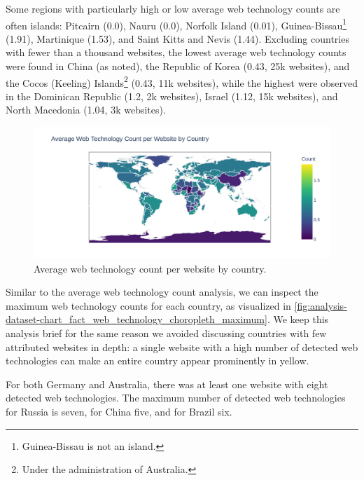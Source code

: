 Some regions with particularly high or low average web technology counts are often islands: Pitcairn (0.0), Nauru (0.0), Norfolk Island (0.01), Guinea-Bissau\footnote{Guinea-Bissau is not an island.} (1.91), Martinique (1.53), and Saint Kitts and Nevis (1.44).
Excluding countries with fewer than a thousand websites, the lowest average web technology counts were found in China (as noted), the Republic of Korea (0.43, 25k websites), and the Cocos (Keeling) Islands\footnote{Under the administration of Australia.} (0.43, 11k websites), while the highest were observed in the Dominican Republic (1.2, 2k websites), Israel (1.12, 15k websites), and North Macedonia (1.04, 3k websites).

\begin{figure}[H]
    \centering
    \includegraphics[width=\textwidth]{figures/charts/large/chart_fact_web_technology_choropleth_average.png}
    \caption{Average web technology count per website by country.}
    \label{fig:analysis-dataset-chart_fact_web_technology_choropleth_average}
\end{figure}

Similar to the average web technology count analysis, we can inspect the maximum web technology counts for each country, as visualized in \cref{fig:analysis-dataset-chart_fact_web_technology_choropleth_maximum}.
We keep this analysis brief for the same reason we avoided discussing countries with few attributed websites in depth: a single website with a high number of detected web technologies can make an entire country appear prominently in yellow.

For both Germany and Australia, there was at least one website with eight detected web technologies.
The maximum number of detected web technologies for Russia is seven, for China five, and for Brazil six.

